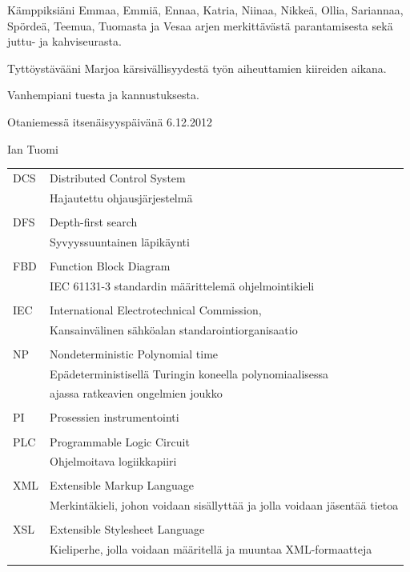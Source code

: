 \documentclass[finnish,12pt]{article}
\begin{document}
Kämppiksiäni Emmaa, Emmiä, Ennaa, Katria, Niinaa, Nikkeä, Ollia, Sariannaa, Spördeä, Teemua, Tuomasta ja Vesaa arjen merkittävästä parantamisesta sekä juttu- ja kahviseurasta.

Tyttöystävääni Marjoa kärsivällisyydestä työn aiheuttamien kiireiden aikana.

Vanhempiani tuesta ja kannustuksesta.

	\vspace{5cm}

Otaniemessä itsenäisyyspäivänä 6.12.2012

\vspace{1mm}
	{\hfill Ian Tuomi \hspace{1cm}}

	\newpage

	\tableofcontents




	\begin{tabular}{ll}	     	    
DCS	& Distributed Control System \\
	& Hajautettu ohjausjärjestelmä \\ \\
DFS	& Depth-first search\\
	& Syvyyssuuntainen läpikäynti \\\\

FBD	& Function Block Diagram\\
	& IEC 61131-3 standardin määrittelemä ohjelmointikieli\\\\
IEC	& International Electrotechnical Commission,\\
	& Kansainvälinen sähköalan standarointiorganisaatio\\\\
NP & Nondeterministic Polynomial time\\
	& Epädeterministisellä Turingin koneella polynomiaalisessa\\&ajassa ratkeavien ongelmien joukko \\\\ 
PI	& Prosessien instrumentointi\\\\
PLC	& Programmable Logic Circuit \\
	& Ohjelmoitava logiikkapiiri\\\\
XML	& Extensible Markup Language\\
	& Merkintäkieli, johon voidaan sisällyttää ja jolla voidaan jäsentää tietoa  \\\\
XSL	& Extensible Stylesheet Language\\
	& Kieliperhe, jolla voidaan määritellä ja muuntaa XML-formaatteja\\\\

\end{tabular}
\end{document}
